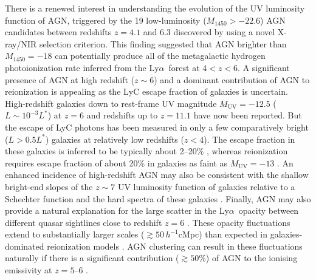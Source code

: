 \documentclass[fleqn,usenatbib]{mnras}
\def\lya{Ly$\alpha$~}
\begin{document}
There is a renewed interest in understanding the evolution of the UV
luminosity function of AGN, triggered by the 19 low-luminosity
($M_{1450}>-22.6$) AGN candidates between redshifts $z=4.1$ and $6.3$
discovered by \citet{2015AA...578A..83G} using a novel X-ray/NIR
selection criterion.  This finding suggested that AGN brighter than
$M_{1450}=-18$ can potentially produce all of the metagalactic
hydrogen photoionization rate inferred from the \lya forest at
$4<z<6$.  A significant presence of AGN at high redshift ($z\sim 6$)
and a dominant contribution of AGN to reionization is appealing as the
LyC escape fraction of galaxies is uncertain.  High-redshift galaxies
down to rest-frame UV magnitude $M_\mathrm{UV}=-12.5$ ($L\sim
10^{-3}L^*$) at $z=6$ \citep{2017ApJ...835..113L} and redshifts up to
$z=11.1$ \citep{2016ApJ...819..129O} have now been reported.  But the
escape of LyC photons has been measured in only a few comparatively
bright ($L>0.5L^*$) galaxies at relatively low redshifts ($z < 4$).
The escape fraction in these galaxies is inferred to be typically
about 2--20\% \citep{2010ApJ...725.1011V, 2011ApJ...736...41B,
  2015ApJ...804...17S, 2015ApJ...810..107M, 2016A&A...585A..48G,
  2017MNRAS.468..389J, 2017MNRAS.465..316M}, whereas reionization
requires escape fraction of about 20\% in galaxies as faint as
$M_\mathrm{UV}=-13$ \citep{2016PASA...33...37F, 2015ApJ...802L..19R,
  2016MNRAS.457.4051K}.  An enhanced incidence of high-redshift AGN
may also be consistent with the shallow bright-end slopes of the
$z\sim 7$ UV luminosity function of galaxies relative to a Schechter
function \citep{2012MNRAS.426.2772B, 2014MNRAS.440.2810B,
  2014ApJ...792...76B, 2015MNRAS.452.1817B} and the hard spectra of
these galaxies \citep{2015MNRAS.450.1846S, 2015MNRAS.454.1393S,
  2017MNRAS.464..469S}.  Finally, AGN may also provide a natural
explanation for the large scatter in the \lya opacity between
different quasar sightlines close to redshift $z=6$
\citep{2015MNRAS.447.3402B, 2018arXiv180208177B}.  These opacity
fluctuations extend to substantially larger scales ($\gtrsim 50\,
h^{-1}$cMpc) than expected in galaxies-dominated reionization models
\citep{2015MNRAS.453.2943C}.  AGN clustering can result in these
fluctuations naturally if there is a significant contribution
($\gtrsim 50\%$) of AGN to the ionising emissivity at $z=5$--$6$
\citep{2017MNRAS.465.3429C}.
\end{document}
